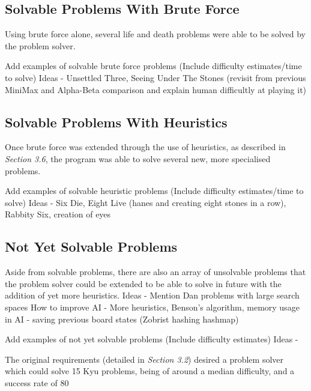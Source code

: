 \documentclass{l3proj}
\begin{document}
\subsection{Solvable Problems With Brute Force}

Using brute force alone, several life and death problems were able to be solved by the problem solver.

Add examples of solvable brute force problems (Include difficulty estimates/time to solve)
Ideas - Unsettled Three, Seeing Under The Stones (revisit from previous MiniMax and Alpha-Beta comparison and explain human difficultly at playing it)

\subsection{Solvable Problems With Heuristics}

Once brute force was extended through the use of heuristics, as described in \textit{Section 3.6}, the program was able to solve several new, more specialised problems.

Add examples of solvable heuristic problems (Include difficulty estimates/time to solve)
Ideas - Six Die, Eight Live (hanes and creating eight stones in a row), Rabbity Six, creation of eyes

\subsection{Not Yet Solvable Problems}

Aside from solvable problems, there are also an array of unsolvable problems that the problem solver could be extended to be able to solve in future with the addition of yet more heuristics.
Ideas - Mention Dan problems with large search spaces
How to improve AI - More heuristics, Benson's algorithm, memory usage in AI - saving previous board states (Zobrist hashing hashmap)

Add examples of not yet solvable problems (Include difficulty estimates)
Ideas - 

The original requirements (detailed in \textit{Section 3.2}) desired a problem solver which could solve 15 Kyu problems, being of around a median difficulty, and a success rate of 80%
\end{document}
